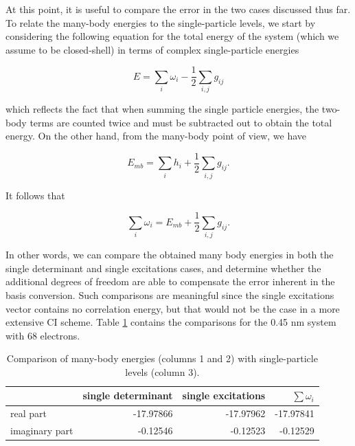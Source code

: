 At this point, it is useful to compare the error in the two cases discussed
thus far. To relate the many-body energies to the single-particle levels, we
start by considering the following equation for the total energy of the system
(which we assume to be closed-shell) in terms of complex single-particle
energies

\begin{equation}
	E = \sum_i \omega_i - \frac{1}{2} \sum_{i,j} g_{ij}
	\label{eq:sptotalenergy}
\end{equation}

which reflects the fact that when summing the single particle energies, the
two-body terms are counted twice and must be subtracted out to obtain the total
energy. On the other hand, from the many-body point of view, we have

\begin{equation}
	E_{mb} = \sum_i h_i + \frac{1}{2} \sum_{i,j} g_{ij}.
	\label{eq:mbtotalenergy}
\end{equation}

It follows that

\begin{equation}
	\sum_i \omega_i = E_{mb} + \frac{1}{2} \sum_{i,j} g_{ij}.
	\label{eq:eesumcomparison}
\end{equation}

In other words, we can compare the obtained many body energies in both the
single determinant and single excitations cases, and determine whether the
additional degrees of freedom are able to compensate the error inherent in the
basis conversion. Such comparisons are meaningful since the single excitations
vector contains no correlation energy, but that would not be the case in a more
extensive \ac{CI} scheme. Table \ref{tab:eesum} contains the comparisons for
the 0.45 nm system with 68 electrons.

\begin{table}
  \centering
  \begin{tabular}{l r r r} 
    \hline
                 & single determinant & single excitations & $\sum \omega_i$ \\
    \hline
    real part      & -17.97866 & -17.97962 & -17.97841\\
    imaginary part & -0.12546 & -0.12523 & -0.12529\\
    \hline
  \end{tabular}
  \caption{Comparison of many-body energies (columns 1 and 2) with
           single-particle levels (column 3).}
  \label{tab:eesum}
\end{table}

